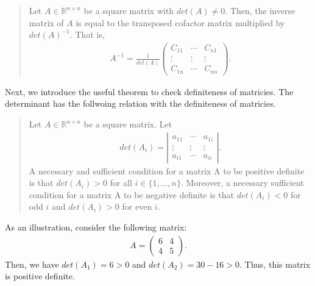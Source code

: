 \documentclass[
  12pt,
]{article}
\begin{document}
\begin{quote}
Let \(A \in \mathbb{R}^{n \times n}\) be a square matrix with
\(det(A) \not= 0\). Then, the inverse matrix of \(A\) is equal to the
transposed cofactor matrix multiplied by \(det(A)^{-1}\). That is,
\begin{align*}
A^{-1} = \frac{1}{det(A)} 
\begin{pmatrix}
C_{11} & \cdots & C_{n1} \\
\vdots & \vdots & \vdots \\
C_{1n} & \cdots & C_{nn}
\end{pmatrix}. 
\end{align*}
\end{quote}

Next, we introduce the useful theorem to check definiteness of
matricies. The determinant has the follwoing relation with the
definiteness of matricies.

\begin{quote}
Let \(A \in \mathbb{R}^{n \times n}\) be a square matrix. Let
\begin{align*}
det(A_i) = 
\left| \begin{array}{ccc}
a_{11} & \cdots & a_{1i} \\
\vdots & \vdots & \vdots \\
a_{i1} & \cdots & a_{ii}
\end{array} \right|. 
\end{align*} A necessary and sufficient condition for a matrix A to be
positive definite is that \(det(A_i) > 0\) for all
\(i \in \{1, \ldots, n\}\). Moreover, a necessary sufficient condition
for a matrix A to be negative definite is that \(det(A_i) < 0\) for odd
\(i\) and \(det(A_i) > 0\) for even \(i\).
\end{quote}

As an illustration, consider the following matrix: \begin{align*}
  A = 
  \begin{pmatrix}
    6 & 4 \\
    4 & 5
  \end{pmatrix}.
\end{align*} Then, we have \(det(A_1) = 6 > 0\) and
\(det(A_2) = 30 - 16 > 0\). Thus, this matrix is positive definite.
\end{document}
